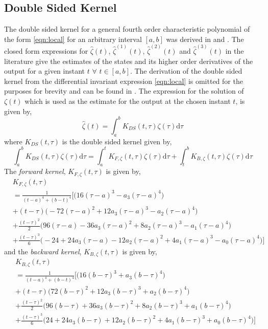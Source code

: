 \documentclass[letterpaper%
, twoside%
, 12pt%
,memoire%
, english%
,creativecommons,hyperref%
]{thETS}
\theoremstyle{newThmStyle}
\begin{document}
\subsection{Double Sided Kernel \citep{RN120}}
The double sided kernel for a general fourth order characteristic polynomial of the form \eqref{eqn:local} for an arbitrary interval $[a,b]$ was derived in \citep{RN83} and \citep{RN120}. The closed form expressions for $\hat{\zeta}(t)$, $\hat{\zeta}^{(1)}(t)$, $\hat{\zeta}^{(2)}(t)$ and $\hat{\zeta}^{(3)}(t)$ in the literature give the estimates of the states and its higher order derivatives of the output for a given instant $t$ $\forall$ $t \in [a,b]$. The derivation of the double sided kernel from the differential invariant expression \eqref{eqn:local} is omitted for the purposes for brevity and can be found in \citep{RN120}. The expression for the solution of $\zeta(t)$ which is used as the estimate for the output at the chosen instant $t$, is given by, 
\begin{equation}\label{eqn:y_estimate}
\hat{\zeta}(t) = \int_{a}^{b} K_{DS}(t,\tau)\zeta(\tau)\mathrm{d}\tau
\end{equation} where $K_{DS}(t,\tau)$ is the double sided kernel given by, 
\begin{equation}\label{eqn:KDS_split}
\int_{a}^{b} K_{DS}(t,\tau)\zeta(\tau)\mathrm{d}\tau = \int_{a}^{t}K_{F,\zeta}(t,\tau)\zeta(\tau)\mathrm{d}\tau + \int_{t}^{b}K_{B,\zeta}(t,\tau)\zeta(\tau)\mathrm{d}\tau 
\end{equation}
The \textit{forward kernel}, $K_{F,\zeta}(t,\tau)$ is given by,
\begin{equation}\label{eqn:forward}
\begin{split}
	& K_{F,\zeta}(t,\tau)\\
	&= \frac{1}{(t-a)^4+(b-t)^4}\bigg[\Big(16(\tau-a)^{3}-a_3(\tau-a)^{4}\Big)\\
	&+(t-\tau)\Big(-72(\tau-a)^2 + 12a_3(\tau-a)^3 - a_2(\tau-a)^4\Big)\\
	&+\frac{(t-\tau)^2}{2}\Big(96(\tau-a) - 36a_3(\tau-a)^2 + 8a_2(\tau-a)^3 -a_1(\tau-a)^4\Big)\\
	&+\frac{(t-\tau)^3}{6}\Big(-24 + 24a_3(\tau-a) - 12a_2(\tau-a)^2 + 4a_1(\tau-a)^3 - a_0(\tau-a)^4\Big)\bigg]	
\end{split}
\end{equation}
and the \textit{backward kernel}, $K_{B,\zeta}(t,\tau)$ is given by,
\begin{equation}\label{eqn:backward}
\begin{split}
	&K_{B,\zeta}(t,\tau)\\
	&=\frac{1}{(t-a)^4+(b-t)^4}\bigg[\Big(16(b-\tau)^{3} + a_3(b-\tau)^{4}\Big)\\
	&+(t-\tau)\Big(72(b-\tau)^{2} + 12a_3(b-\tau)^{3} + a_2(b-\tau)^{4}\Big)\\
	&+\frac{(t-\tau)^{2}}{2}\Big(96(b-\tau)+36a_3(b-\tau)^{2} + 8a_2(b-\tau)^{3} + a_1(b-\tau)^{4}\Big)\\
	&+\frac{(t-\tau)^{3}}{6}\Big(24+24a_3(b-\tau)+12a_2(b-\tau)^{2}+4a_1(b-\tau)^{3}+a_0(b-\tau)^{4}\Big)\bigg]
\end{split}
\end{equation}
\end{document}
